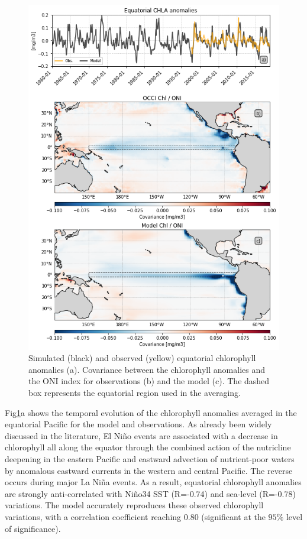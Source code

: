 \begin{figure}[h!tp]
	\centering
	\includegraphics[scale=0.4]{figs/fig2.png}
	\caption{Simulated (black) and observed (yellow) equatorial chlorophyll anomalies (a). Covariance between the chlorophyll anomalies and the ONI index for observations (b) and the model (c). The dashed box represents the equatorial region used in the averaging.}
	\label{fig:nemo-sat-chl}
\end{figure}

Fig\ref{fig:nemo-sat-chl}a shows the temporal evolution of the chlorophyll anomalies averaged in the equatorial Pacific for the model and observations. As already been widely discussed in the literature, El Niño events are associated with a decrease in chlorophyll all along the equator through the combined action of the nutricline deepening in the eastern Pacific and eastward advection of nutrient‐poor waters by anomalous eastward currents in the western and central Pacific. The reverse occurs during major La Niña events. As a result, equatorial chlorophyll anomalies are strongly anti-correlated with Niño34 SST (R=-0.74) and sea-level (R=-0.78) variations. The model accurately reproduces these observed chlorophyll variations, with a correlation coefficient reaching $0.80$ (significant at the $95\%$ level of significance).

